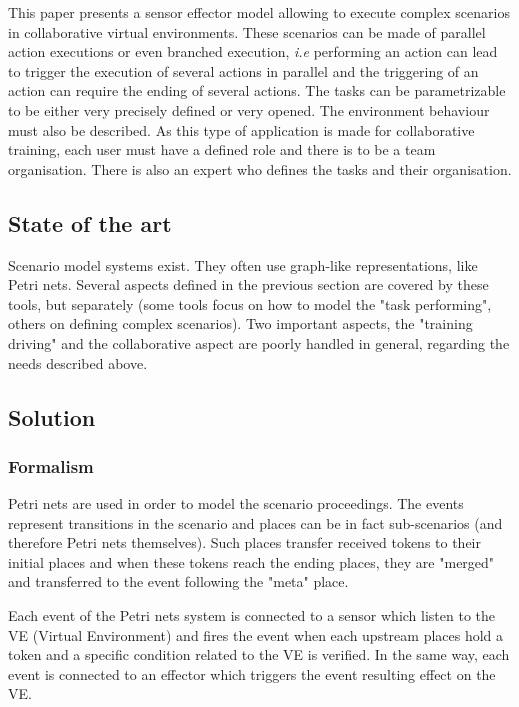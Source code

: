 \documentclass[a4paper]{article}
\begin{document}
This paper presents a sensor effector model allowing to execute complex scenarios in collaborative virtual environments. These scenarios can be made of parallel action executions or even branched execution, \textit{i.e} performing an action can lead to trigger the execution of several actions in parallel and the triggering of an action can require the ending of several actions. The tasks can be parametrizable to be either very precisely defined or very opened. The environment behaviour must also be described. As this type of application is made for collaborative training, each user must have a defined role and there is to be a team organisation. There is also an expert who defines the tasks and their organisation.

\subsection{State of the art}

Scenario model systems exist. They often use graph-like representations, like Petri nets. Several aspects defined in the previous section are covered by these tools, but separately (some tools focus on how to model the "task performing", others on defining complex scenarios). Two important aspects, the "training driving" and the collaborative aspect are poorly handled in general, regarding the needs described above.

\subsection{Solution}

\subsubsection{Formalism}
Petri nets are used in order to model the scenario proceedings. The events represent transitions in the scenario and places can be in fact sub-scenarios (and therefore Petri nets themselves). Such places transfer received tokens to their initial places and when these tokens reach the ending places, they are "merged" and transferred to the event following the "meta" place.

Each event of the Petri nets system  is connected to a sensor which listen to the VE (Virtual Environment) and fires the event when each upstream places hold a token and a specific condition related to the VE is verified. In the same way, each event is connected to an effector which triggers the event resulting effect on the VE.
\end{document}
